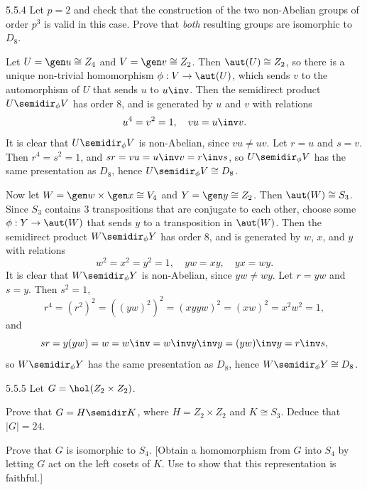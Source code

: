 \begin{exercise}{5.5.4}
    Let $p = 2$ and check that the construction of the two non-Abelian groups of order $p^3$ is valid in this case.
	Prove that \emph{both} resulting groups are isomorphic to $D_8$.
\end{exercise}

\begin{sol}
    Let $U = \gen u \cong Z_4$ and $V = \gen v \cong Z_2$.
	Then $\aut(U) \cong Z_2$, so there is a unique non-trivial homomorphism $\phi : V \to \aut(U)$, which sends $v$ to the automorphism of $U$ that sends $u$ to $u\inv$.
	Then the semidirect product $U \semidir_\phi V$ has order 8, and is generated by $u$ and $v$ with relations
    \[
    	u^4 = v^2 = 1, \quad vu = u\inv v.
    \]
    It is clear that $U \semidir_\phi V$ is non-Abelian, since $vu \neq uv$.
	Let $r = u$ and $s = v$.
	Then $r^4 = s^2 = 1$, and $sr = vu = u\inv v = r\inv s$, so $U \semidir_\phi V$ has the same presentation as $D_8$, hence $U \semidir_\phi V \cong D_8$.

    Now let $W = \gen w \times \gen x \cong V_4$ and $Y = \gen y \cong Z_2$.
	Then $\aut(W) \cong S_3$.
	Since $S_3$ contains 3 transpositions that are conjugate to each other, choose some $\phi : Y \to \aut(W)$ that sends $y$ to a transposition in $\aut(W)$.
	Then the semidirect product $W \semidir_\phi Y$ has order 8, and is generated by $w$, $x$, and $y$ with relations
    \[
    	w^2 = x^2 = y^2 = 1, \quad yw = x y, \quad yx = w y.
    \]
    It is clear that $W \semidir_\phi Y$ is non-Abelian, since $yw \neq wy$.
	Let $r = yw$ and $s = y$.
	Then $s^2 = 1$,
    \[
    	r^4 = (r^2)^2 = ((yw)^2)^2 = (xyyw)^2 = (xw)^2 = x^2w^2 = 1,
    \]
    and
    \[
    	sr = y(yw) = w = w\inv = w\inv y\inv y = (yw)\inv y = r\inv s,
    \]
    so $W \semidir_\phi Y$ has the same presentation as $D_8$, hence $W \semidir_\phi Y \cong D_8$.
\end{sol}

\begin{exercise}{5.5.5}
    Let $G = \hol(Z_2 \times Z_2)$.
    \begin{subexercises}
        \item Prove that $G = H \semidir K$, where $H = Z_2 \times Z_2$ and $K \cong S_3$.
	    Deduce that $|G| = 24$.
        \item Prove that $G$ is isomorphic to $S_4$. [Obtain a homomorphism from $G$ into $S_4$ by letting $G$ act on the left cosets of $K$.
	    Use  to show that this representation is faithful.]
    \end{subexercises}
\end{exercise}

